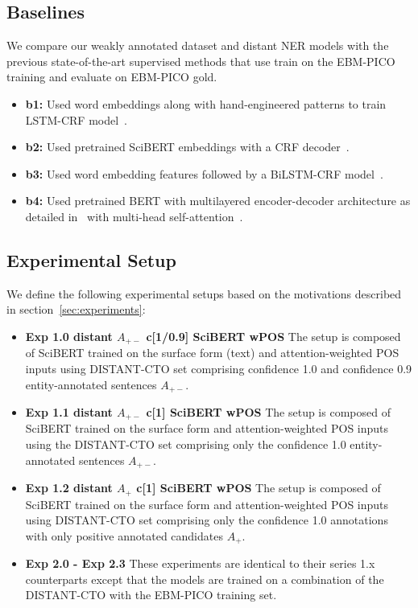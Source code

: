 \documentclass[letterpaper]{article} %
\begin{document}
\subsection{Baselines}
\label{subsec:base}
%
We compare our weakly annotated dataset and distant NER models with the previous state-of-the-art supervised methods that use train on the EBM-PICO training and evaluate on EBM-PICO gold.
\begin{itemize}
    \item \textbf{b1:} Used word embeddings along with hand-engineered patterns to train LSTM-CRF model~\cite{nye2018corpus}. %
    \item \textbf{b2:} Used pretrained SciBERT embeddings with a CRF decoder~\cite{beltagy2019scibert}.
    \item \textbf{b3:} Used word embedding features followed by a BiLSTM-CRF model~\cite{brockmeier2019improving}.
    \item \textbf{b4:} Used pretrained BERT with multilayered encoder-decoder architecture as detailed in~\cite{vaswani2017attention} with multi-head self-attention~\cite{stylianou2021transformed}.
\end{itemize}
%
\subsection{Experimental Setup}
\label{subsec:expsetup}
%
We define the following experimental setups based on the motivations described in section~\ref{sec:experiments}:
\begin{itemize}
    \item \textbf{Exp 1.0 distant $A_{+-}$ c[1/0.9] SciBERT wPOS} The setup is composed of SciBERT trained on the surface form (text) and attention-weighted POS inputs using DISTANT-CTO set comprising confidence 1.0 and confidence 0.9 entity-annotated sentences $A_{+-}$.
    \item \textbf{Exp 1.1 distant $A_{+-}$ c[1] SciBERT wPOS} The setup is composed of SciBERT trained on the surface form and attention-weighted POS inputs using the DISTANT-CTO set comprising only the confidence 1.0 entity-annotated sentences $A_{+-}$.
    \item \textbf{Exp 1.2 distant $A_{+}$ c[1] SciBERT wPOS} The setup is composed of SciBERT trained on the surface form and attention-weighted POS inputs using DISTANT-CTO set comprising only the confidence 1.0 annotations with only positive annotated candidates $A_{+}$.
    \item \textbf{Exp 2.0 - Exp 2.3 } These experiments are identical to their series 1.x counterparts except that the models are trained on a combination of the DISTANT-CTO with the EBM-PICO training set.
\end{itemize}
%
\end{document}
